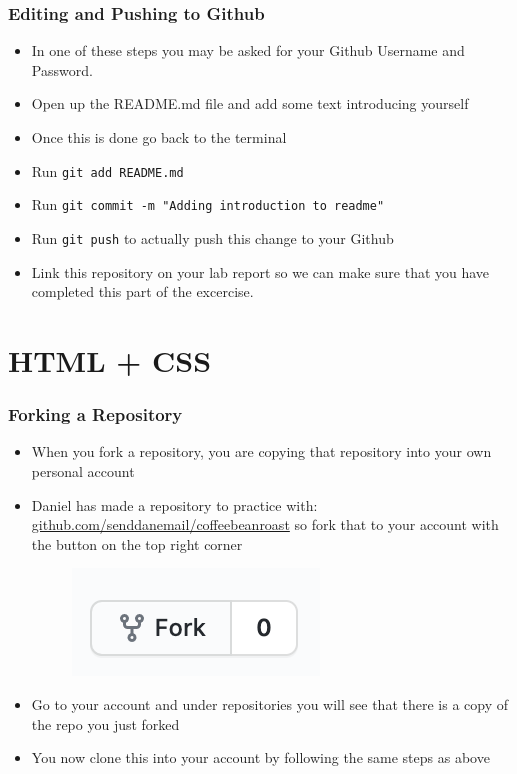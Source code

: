 \documentclass{beamer}
\begin{document}
\begin{frame}
  \frametitle{Editing and Pushing to Github}
  \begin{itemize}
  	\item In one of these steps you may be asked for your Github Username and Password.
  	\item Open up the README.md file and add some text introducing yourself
  	\item Once this is done go back to the terminal
  	\item Run \texttt{git add README.md}
  	\item Run \texttt{git commit -m "Adding introduction to readme"}
  	\item Run \texttt{git push} to actually push this change to your Github
  	\item Link this repository on your lab report so we can make sure that you have completed this part of the excercise.
 \end{itemize}
\end{frame}


\section{HTML + CSS}

\begin{frame}
  \frametitle{Forking a Repository}
  \begin{itemize}
  	\item When you fork a repository, you are copying that repository into your own personal account
  	\item Daniel has made a repository to practice with: \href{https://github.com/senddanemail/coffeebeanroast}{github.com/senddanemail/coffeebeanroast} so fork that to your account with the button on the top right corner 
  	\begin{figure}
  	\includegraphics[scale=0.5]{./fork}
	\end{figure}
  	\item Go to your account and under repositories you will see that there is a copy of the repo you just forked
  	\item You now clone this into your account by following the same steps as above
 \end{itemize}
\end{frame}
\end{document}
